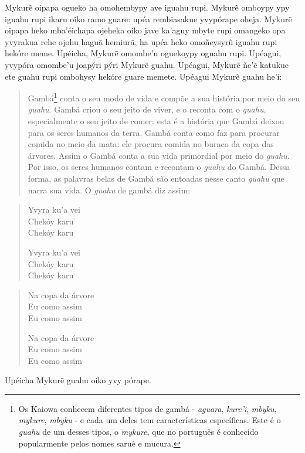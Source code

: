 Mykurẽ oipapa ogueko ha omohembypy ave iguahu rupi. Mykurẽ omboypy ypy
iguahu rupi ikaru oiko ramo guare: upéa rembiasakue yvypórape oheja.
Mykurẽ oipapa heko mba'éichapa ojeheka oiko jave ka'aguy mbyte rupi
omangeko opa yvyrakua rehe ojohu haguã hemiurã, ha upéa heko omoñeysyrũ
iguahu rupi hekóre meme. Upéicha, Mykurẽ omombe'u oguekoypy oguahu rupi.
Upéagui, yvypóra omombe'u joapýri pýri Mykurẽ guahu. Upéagui, Mykurẽ
ñe'ẽ katukue ete guahu rupi ombohysy hekóre guare memete. Upéagui Mykurẽ
guahu he'i:

\begin{quote}
Gambá\footnote{Os Kaiowa conhecem diferentes tipos de gambá -
  \emph{aguara}, \emph{kure'i}, \emph{mbyku}, \emph{mykure},
  \emph{mbyku} - e cada um deles tem características específicas. Este é
  o \emph{guahu} de um desses tipos, o \emph{mykure}, que no português é
  conhecido popularmente pelos nomes saruê e mucura.} conta o seu modo
de vida e compõe a sua história por meio do seu \emph{guahu}. Gambá
criou o seu jeito de viver, e o reconta com o \emph{guahu},
especialmente o seu jeito de comer: esta é a história que Gambá deixou
para os seres humanos da terra. Gambá conta como faz para procurar
comida no meio da mata: ele procura comida no buraco da copa das
árvores. Assim o Gambá conta a sua vida primordial por meio do
\emph{guahu}. Por isso, os seres humanos contam e recontam o
\emph{guahu} do Gambá. Dessa forma, as palavras belas de Gambá são
entoadas nesse canto \emph{guahu} que narra sua vida. O \emph{guahu} de
gambá diz assim:
\end{quote}


\begin{verse}
Yvyra ku'a vei\\
Chekóy karu\\
Chekóy karu

Yvyra ku'a vei\\
Chekóy karu\\
Chekóy karu
\end{verse}

\begin{verse}
Na copa da árvore\\
Eu como assim\\
Eu como assim

Na copa da árvore\\
Eu como assim\\
Eu como assim
\end{verse}

Upéicha Mykurẽ guahu oiko yvy pórape.

